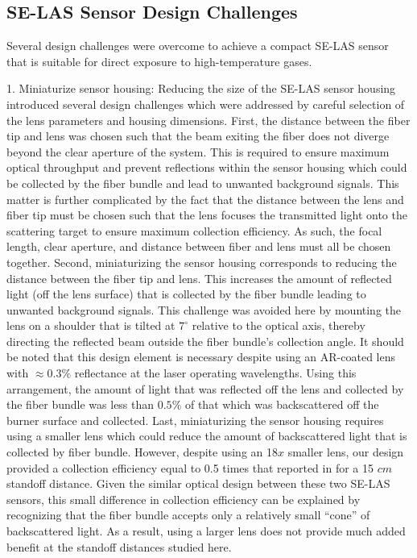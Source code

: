 \subsection{SE-LAS Sensor Design Challenges}
Several design challenges were overcome to achieve a compact SE-LAS sensor that is suitable for direct exposure to high-temperature gases.

1. Miniaturize sensor housing: Reducing the size of the SE-LAS sensor housing introduced several design challenges which were addressed by careful selection of the lens parameters and housing dimensions. First, the distance between the fiber tip and lens was chosen such that the beam exiting the fiber does not diverge beyond the clear aperture of the system. This is required to ensure maximum optical throughput and prevent reflections within the sensor housing which could be collected by the fiber bundle and lead to unwanted background signals. This matter is further complicated by the fact that the distance between the lens and fiber tip must be chosen such that the lens focuses the transmitted light onto the scattering target to ensure maximum collection efficiency. As such, the focal length, clear aperture, and distance between fiber and lens must all be chosen together.
Second, miniaturizing the sensor housing corresponds to reducing the distance between the fiber tip and lens. This increases the amount of reflected light (off the lens surface) that is collected by the fiber bundle leading to unwanted background signals. This challenge was avoided here by mounting the lens on a shoulder that is tilted at $7^{\circ}$ relative to the optical axis, thereby directing the reflected beam outside the fiber bundle’s collection angle. It should be noted that this design element is necessary despite using an AR-coated lens with $\approx 0.3\%$ reflectance at the laser operating wavelengths. Using this arrangement, the amount of light that was reflected off the lens and collected by the fiber bundle was less than $0.5\%$ of that which was backscattered off the burner surface and collected.
Last, miniaturizing the sensor housing requires using a smaller lens which could reduce the amount of backscattered light that is collected by fiber bundle. However, despite using an 18$x$ smaller lens, our design provided a collection efficiency equal to 0.5 times that reported in \cite{Goldenstein:16} for a 15 $cm$ standoff distance. Given the similar optical design between these two SE-LAS sensors, this small difference in collection efficiency can be explained by recognizing that the fiber bundle accepts only a relatively small “cone” of backscattered light. As a result, using a larger lens does not provide much added benefit at the standoff distances studied here.

